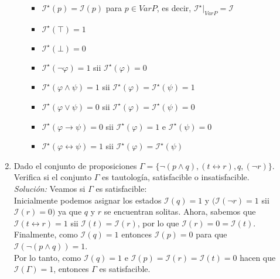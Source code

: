 \documentclass[letterpaper,10pt]{article}
\begin{document}
\begin{enumerate}
\begin{itemize}
\begin{teo}
                \begin{itemize}
                    \item $\mathcal{I^{\star}}(p) = \mathcal{I}(p)$ para 
                    $p \in Var P$, es decir, 
                    $\mathcal{I^{\star}}|_{Var P} = \mathcal{I}$
                    \item $\mathcal{I^{\star}}(\top) = 1$
                    \item $\mathcal{I^{\star}}(\bot) = 0$
                    \item $\mathcal{I^{\star}}(\neg \varphi) = 1$ sii 
                    $\mathcal{I^{\star}}(\varphi) = 0$
                    \item $\mathcal{I^{\star}}(\varphi \land \psi) = 1$
                    sii $\mathcal{I^{\star}}(\varphi) = 
                    \mathcal{I^{\star}}(\psi) = 1$
                    \item $\mathcal{I^{\star}}(\varphi \lor \psi) = 0$
                    sii $\mathcal{I^{\star}}(\varphi) = 
                    \mathcal{I^{\star}}(\psi) = 0$
                    \item $\mathcal{I^{\star}}(\varphi \rightarrow \psi) = 0$
                    sii $\mathcal{I^{\star}}(\varphi) = 1$ e
                    $\mathcal{I^{\star}}(\psi) = 0$
                    \item $\mathcal{I^{\star}}(\varphi \leftrightarrow \psi) = 1$
                    sii $\mathcal{I^{\star}}(\varphi) = 
                    \mathcal{I^{\star}}(\psi)$
                \end{itemize}
            \end{teo}
        \end{itemize}

        \item Dado el conjunto de proposiciones 
        $\Gamma = \{ \neg (p \land q), (t \leftrightarrow r), q, (\neg r) \}$.
        Verifica si el conjunto $\Gamma$ es tautología, satisfacible o
        insatisfacible. \\
        \textit{Solución:} Veamos si $\Gamma$ es satisfacible: \\
        Inicialmente podemos asignar los estados $\mathcal{I}(q) = 1$ y
        $(\mathcal{I}(\neg r) = 1$ sii $\mathcal{I}(r) = 0)$ ya que $q$ y $r$
        se encuentran solitas. Ahora, sabemos que 
        $\mathcal{I}(t \leftrightarrow r) = 1$ sii 
        $\mathcal{I}(t) = \mathcal{I}(r)$, por lo que 
        $\mathcal{I}(r) = 0 = \mathcal{I}(t)$. Finalmente, como 
        $\mathcal{I}(q) = 1$ entonces $\mathcal{I}(p) = 0$ para que 
        $\mathcal{I}(\neg (p \land q)) = 1$. \\
        Por lo tanto, como $\mathcal{I}(q) = 1$ e 
        $\mathcal{I}(p) = \mathcal{I}(r) = \mathcal{I}(t) = 0$ hacen que 
        $\mathcal{I}(\Gamma) = 1$, entonces $\Gamma$ es satisfacible. \\


\end{enumerate}
\end{document}
